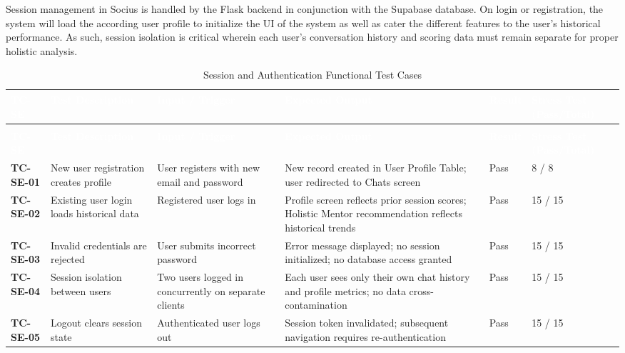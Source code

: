  Session management in Socius is handled by the Flask backend in conjunction with the Supabase database. On login or registration, the system will load the
according user profile to initialize the UI of the system as well as cater the different features to the user's historical performance. As such, session isolation
is critical wherein each user's conversation history and scoring data must remain separate for proper holistic analysis.
 
\begin{longtable}{>{\bfseries}p{1.2cm} p{3.0cm} p{3.5cm} p{4.5cm} p{1.0cm} p{1.5cm}}
\caption{Session and Authentication Functional Test Cases}
\label{tab:tc-se} \\
 
\rowcolor{headerblue}
\textcolor{white}{\textbf{TC-SE}} &
\textcolor{white}{\textbf{Test Description}} &
\textcolor{white}{\textbf{Input / Trigger}} &
\textcolor{white}{\textbf{Expected Output}} &
\textcolor{white}{\textbf{Result}} &
\textcolor{white}{\textbf{Stress Test (Pass/Total)}} \\
\endfirsthead
 
\multicolumn{6}{c}{\tablename\ \thetable{} -- continued} \\
\rowcolor{headerblue}
\textcolor{white}{\textbf{TC-SE}} &
\textcolor{white}{\textbf{Test Description}} &
\textcolor{white}{\textbf{Input / Trigger}} &
\textcolor{white}{\textbf{Expected Output}} &
\textcolor{white}{\textbf{Result}} &
\textcolor{white}{\textbf{Stress Test (Pass/Total)}} \\
\endhead
 
\midrule
TC-SE-01 & New user registration creates profile & User registers with new email and password & New record created in User Profile Table; user redirected to Chats screen & Pass & 8 / 8 \\
\midrule
TC-SE-02 & Existing user login loads historical data & Registered user logs in & Profile screen reflects prior session scores; Holistic Mentor recommendation reflects historical trends & Pass & 15 / 15 \\
\midrule
TC-SE-03 & Invalid credentials are rejected & User submits incorrect password & Error message displayed; no session initialized; no database access granted & Pass & 15 / 15 \\
\midrule
TC-SE-04 & Session isolation between users & Two users logged in concurrently on separate clients & Each user sees only their own chat history and profile metrics; no data cross-contamination & Pass & 15 / 15 \\
\midrule
TC-SE-05 & Logout clears session state & Authenticated user logs out & Session token invalidated; subsequent navigation requires re-authentication & Pass & 15 / 15 \\
\bottomrule
\end{longtable}
 
